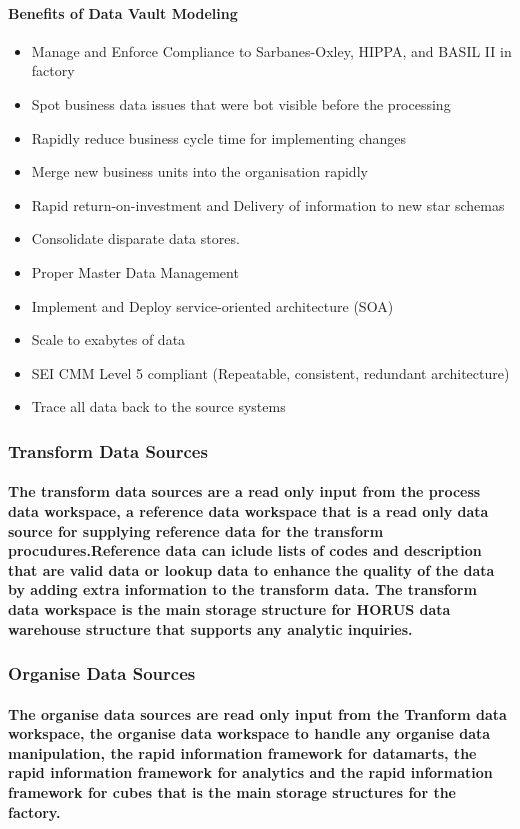\documentclass{acm_proc_article-sp}
\begin{document}
\paragraph{Benefits of Data Vault Modeling}
\begin{itemize}
\item Manage and Enforce Compliance to Sarbanes-Oxley, HIPPA, and BASIL II in factory
\item Spot business data issues that were bot visible before the processing
\item Rapidly reduce business cycle time for implementing changes
\item Merge new business units into the organisation rapidly
\item Rapid return-on-investment and Delivery of information to new star schemas
\item Consolidate disparate data stores.
\item Proper Master Data Management
\item Implement and Deploy service-oriented architecture (SOA)
\item Scale to exabytes of data
\item SEI CMM Level 5 compliant (Repeatable, consistent, redundant architecture)
\item Trace all data back to the source systems
\end{itemize}
\subsubsection{Transform Data Sources}
\paragraph{The transform data sources are a read only input from the process data workspace, a reference data workspace that is a read only data source for supplying reference data for the transform procudures.Reference data can iclude lists of codes and description that are valid data or lookup data to enhance the quality of the data by adding extra information to the transform data. The transform data workspace is the main storage structure for HORUS data warehouse structure that supports any analytic inquiries.}
\subsubsection{Organise Data Sources}
\paragraph{The organise data sources are read only input from the Tranform data workspace, the organise data workspace to handle any organise data manipulation, the rapid information framework for datamarts, the rapid information framework for analytics and the rapid information framework for cubes that is the main storage structures for the factory.}
\end{document}
